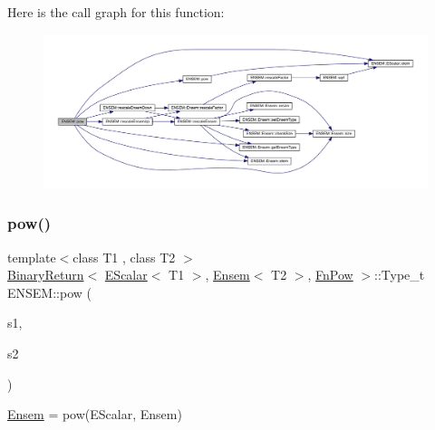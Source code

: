 Here is the call graph for this function\+:\nopagebreak
\begin{figure}[H]
\begin{center}
\leavevmode
\includegraphics[width=350pt]{d1/d9e/group__eensem_ga56e0a919e0060bdb32e0b2aa9ea97f11_cgraph}
\end{center}
\end{figure}
\mbox{\label{group__eensem_gae3b272ae394d114d478f320d24ca05df}} 
\subsubsection{\texorpdfstring{pow()}{pow()}\hspace{0.1cm}{\footnotesize\ttfamily [4/4]}}
{\footnotesize\ttfamily template$<$class T1 , class T2 $>$ \\
\mbox{\hyperlink{structENSEM_1_1BinaryReturn}{Binary\+Return}}$<$ \mbox{\hyperlink{classENSEM_1_1EScalar}{E\+Scalar}}$<$ T1 $>$, \mbox{\hyperlink{classENSEM_1_1Ensem}{Ensem}}$<$ T2 $>$, \mbox{\hyperlink{structENSEM_1_1FnPow}{Fn\+Pow}} $>$\+::Type\+\_\+t E\+N\+S\+E\+M\+::pow (\begin{DoxyParamCaption}\item[{const \mbox{\hyperlink{classENSEM_1_1EScalar}{E\+Scalar}}$<$ T1 $>$ \&}]{s1,  }\item[{const \mbox{\hyperlink{classENSEM_1_1Ensem}{Ensem}}$<$ T2 $>$ \&}]{s2 }\end{DoxyParamCaption})\hspace{0.3cm}{\ttfamily [inline]}}



\mbox{\hyperlink{classENSEM_1_1Ensem}{Ensem}} = pow(\+E\+Scalar, Ensem) 

